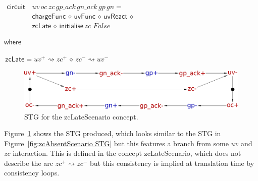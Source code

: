 \documentclass[british,compsoc]{IEEEtran}
\begin{document}
\begin{minipage}[t]{1\columnwidth}%
\begin{flushleft}
$\begin{aligned}\\\mathsf{circuit}&\,uv \,oc \,zc \,gp\_ack \,gn\_ack \,gp \,gn = \\
& \mathsf{\, chargeFunc}\,\diamond\,\mathsf{uvFunc}\,\diamond\,\mathsf{uvReact}\,\diamond\\
& \,\mathsf{zcLate}\,\diamond\,\mathsf{initialise}\,zc\,\,False
\end{aligned}
$
\par\end{flushleft}%

\par\begin{flushleft}
$\mathsf{where}$
\par\end{flushleft}

\begin{flushleft}
$\,\mathsf{zcLate}=uv^{+}\rightsquigarrow zc^{+}\,\diamond\, zc^{-}\rightsquigarrow uv^{-}$
\par\end{flushleft}

\end{minipage}

\begin{figure}[H]
\begin{centering}
\includegraphics[scale=0.22]{Images/stg-UV_before_ZC}
\par\end{centering}

\protect\caption{\label{fig:zcLateScenario STG}STG for the \textsf{zcLateScenario}
concept.}

\end{figure}

Figure~\ref{fig:zcLateScenario STG} shows the STG produced, which
looks similar to the STG in Figure~\ref{fig:zcAbsentScenario STG}
but this features a branch from some $uv$ and $zc$ interaction.
This is defined in the concept \textsf{zcLateScenario}, which does
not describe the arc $zc^{+}\rightsquigarrow zc^{-}$ but this consistency
is implied at translation time by consistency loops.
\end{document}
